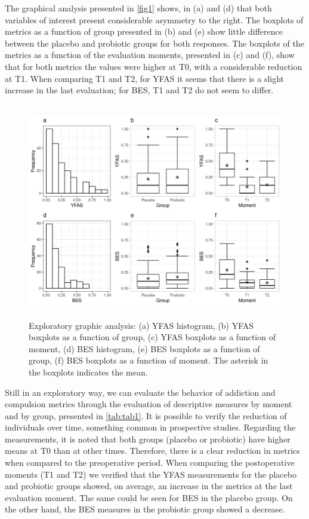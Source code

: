\documentclass[USenglish]{article}
\theoremstyle{dgthm}
\theoremstyle{dgdef}
\begin{document}

The graphical analysis presented in \autoref{fig1} shows, in (a) and (d) that both variables of interest present considerable asymmetry to the right. The boxplots of metrics as a function of group presented in (b) and (e) show little difference between the placebo and probiotic groups for both responses. The boxplots of the metrics as a function of the evaluation moments, presented in (c) and (f), show that for both metrics the values were higher at T0, with a considerable reduction at T1. When comparing T1 and T2, for YFAS it seems that there is a slight increase in the last evaluation; for BES, T1 and T2 do not seem to differ.

\begin{figure}[H]
\centering
\includegraphics[width=29.6pc,height=22.2pc]{FIGURES/FIGURE1.jpeg}
\caption{Exploratory graphic analysis: (a) YFAS histogram, (b) YFAS boxplots as a function of group, (c) YFAS boxplots as a function of moment, (d) BES histogram, (e) BES boxplots as a function of group, (f) BES boxplots as a function of moment. The asterisk in the boxplots indicates the mean.\label{fig1}}
\end{figure}

Still in an exploratory way, we can evaluate the behavior of addiction and compulsion metrics through the evaluation of descriptive measures by moment and by group, presented in \autoref{tab:tab1}. It is possible to verify the reduction of individuals over time, something common in prospective studies. Regarding the measurements, it is noted that both groups (placebo or probiotic) have higher means at T0 than at other times. Therefore, there is a clear reduction in metrics when compared to the preoperative period. When comparing the postoperative moments (T1 and T2) we verified that the YFAS measurements for the placebo and probiotic groups showed, on average, an increase in the metrics at the last evaluation moment. The same could be seen for BES in the placebo group. On the other hand, the BES measures in the probiotic group showed a decrease.
\end{document}
